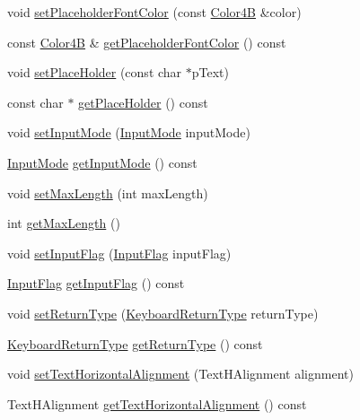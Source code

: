 \begin{DoxyCompactItemize}
void \hyperlink{classui_1_1EditBox_a29ddb4a951ce3cd8c2946ed13cf4c2ee}{set\+Placeholder\+Font\+Color} (const \hyperlink{structColor4B}{Color4B} \&color)
\item 
const \hyperlink{structColor4B}{Color4B} \& \hyperlink{classui_1_1EditBox_a267922ed1ab9d6eb1192987584983e70}{get\+Placeholder\+Font\+Color} () const
\item 
void \hyperlink{classui_1_1EditBox_a89c526a2899c99ff09bd9fb6e435e799}{set\+Place\+Holder} (const char $\ast$p\+Text)
\item 
const char $\ast$ \hyperlink{classui_1_1EditBox_aadbd55732eaedc4bc678f8c25395319a}{get\+Place\+Holder} () const
\item 
void \hyperlink{classui_1_1EditBox_ad1b58227c6cf26800613983688c82066}{set\+Input\+Mode} (\hyperlink{classui_1_1EditBox_a7a1bfe8f3ba218bedfcf5451ec3ce01a}{Input\+Mode} input\+Mode)
\item 
\hyperlink{classui_1_1EditBox_a7a1bfe8f3ba218bedfcf5451ec3ce01a}{Input\+Mode} \hyperlink{classui_1_1EditBox_aca9e89e806845c12585cecb69468b7f9}{get\+Input\+Mode} () const
\item 
void \hyperlink{classui_1_1EditBox_a7f9fd5527404e0dc6e98e23a661325b4}{set\+Max\+Length} (int max\+Length)
\item 
int \hyperlink{classui_1_1EditBox_acd8e23e5b2db7c3b27a8e7cf9ce320c3}{get\+Max\+Length} ()
\item 
void \hyperlink{classui_1_1EditBox_ab76860616e5d9d7b1601e2a203a8c82a}{set\+Input\+Flag} (\hyperlink{classui_1_1EditBox_af02f13ee9fba51d59bb3111e200848c8}{Input\+Flag} input\+Flag)
\item 
\hyperlink{classui_1_1EditBox_af02f13ee9fba51d59bb3111e200848c8}{Input\+Flag} \hyperlink{classui_1_1EditBox_a376fa08f66d2a3f6741a93d76b4ea1dc}{get\+Input\+Flag} () const
\item 
void \hyperlink{classui_1_1EditBox_a7f574c7c67fa4779fd34acad947a95ed}{set\+Return\+Type} (\hyperlink{classui_1_1EditBox_a1e1285b6f742975b26bdeb8108ca6e51}{Keyboard\+Return\+Type} return\+Type)
\item 
\hyperlink{classui_1_1EditBox_a1e1285b6f742975b26bdeb8108ca6e51}{Keyboard\+Return\+Type} \hyperlink{classui_1_1EditBox_a2c838259c0204c3cd983b0c09b59741a}{get\+Return\+Type} () const
\item 
void \hyperlink{classui_1_1EditBox_afc334fb2759ea97216ee10f501a7e988}{set\+Text\+Horizontal\+Alignment} (Text\+H\+Alignment alignment)
\item 
Text\+H\+Alignment \hyperlink{classui_1_1EditBox_a4fa4d53ceaa22523da93c430b0182a1f}{get\+Text\+Horizontal\+Alignment} () const

\end{DoxyCompactItemize}
